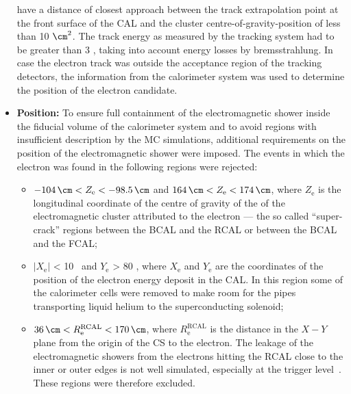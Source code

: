 \begin{itemize}
	have a distance of closest approach between the track extrapolation point at the front surface of the CAL and the cluster centre-of-gravity-position of less than 10 $\cm^2$. The track energy as measured by the tracking system had to be greater than 3 \GeV, taking into account energy losses by bremsstrahlung. In case the electron track was outside the acceptance region of the tracking detectors, the information from the calorimeter system was used to determine the position of the electron candidate.
	\item \textbf{Position:} To ensure full containment of the electromagnetic shower inside the fiducial volume of the calorimeter system and to avoid regions with insufficient description by the MC simulations, additional requirements on the position of the electromagnetic shower were imposed. The events in which the electron was found in the following regions were rejected:
	\begin{itemize}
		\item $ -104\, \cm < Z_\text{e} < -98.5\, \cm	$ and $ 164\, \cm < Z_\text{e} < 174\, \cm $, where $Z_\text{e}$ is the longitudinal coordinate of the centre of gravity of the of the electromagnetic cluster attributed to the electron --- the so called ``super-crack'' regions between the BCAL and the RCAL or between the BCAL and the FCAL;
		\item $\left| X_\text{e} \right|$ < 10 \cm\, and $Y_\text{e}$ > 80 \cm, where $X_\text{e}$ and $Y_\text{e}$ are the coordinates of the position of the electron energy deposit in the CAL. In this region some of the calorimeter cells were removed to make room for the  pipes transporting  liquid helium to the superconducting solenoid;
		\item $ 36\, \cm < R^\text{RCAL}_\text{e} < 170\, \cm $, where $R^\text{RCAL}_\text{e}$ is the distance in the $X-Y$ plane from the origin of the \zeus CS to the electron. The leakage of the electromagnetic showers from the electrons hitting the RCAL close to the inner or outer edges is not well simulated, especially at the trigger level~\cite{thesis:januschek:2011}. These regions were therefore excluded. 
	\end{itemize}
\end{itemize}

